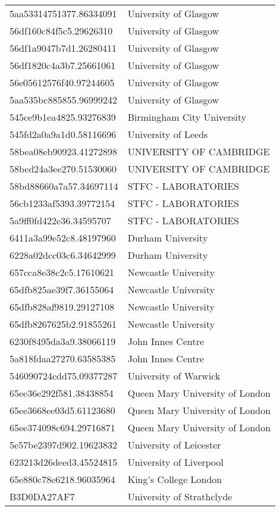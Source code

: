\begin{tabular}{ll}
5aa53314751377.86334091 & University of Glasgow \\
56df160c84f5c5.29626310 & University of Glasgow \\
56df1a9047b7d1.26280411 & University of Glasgow \\
56df1820c4a3b7.25661061 & University of Glasgow \\
56e05612576f40.97244605 & University of Glasgow \\
5aa535bc885855.96999242 & University of Glasgow \\
545ce9b1ea4825.93276839 & Birmingham City University \\
545fd2a0a9a1d0.58116696 & University of Leeds \\
58bea08eb90923.41272898 & UNIVERSITY OF CAMBRIDGE \\
58bed24a3ee270.51530060 & UNIVERSITY OF CAMBRIDGE \\
58bd88660a7a57.34697114 & STFC - LABORATORIES \\
56cb1233af5393.39772154 & STFC - LABORATORIES \\
5a9ff0fd422e36.34595707 & STFC - LABORATORIES \\
6411a3a99e52c8.48197960 & Durham University \\
6228a02dcc03c6.34642999 & Durham University \\
657cca8e38c2c5.17610621 & Newcastle University \\
65dfb825ae39f7.36155064 & Newcastle University \\
65dfb828af9819.29127108 & Newcastle University \\
65dfb8267625b2.91855261 & Newcastle University \\
6230f8495da3a9.38066119 & John Innes Centre \\
5a818fdaa27270.63585385 & John Innes Centre \\
546090724cdd75.09377287 & University of Warwick \\
65ee36e292f581.38438854 & Queen Mary University of London \\
65ee3668ee03d5.61123680 & Queen Mary University of London \\
65ee374098c694.29716871 & Queen Mary University of London \\
5e57be2397d902.19623832 & University of Leicester \\
623213d26deed3.45524815 & University of Liverpool \\
65e880c78e6218.96035964 & King's College London \\
B3D0DA27AF7 & University of Strathclyde \\

\end{tabular}
